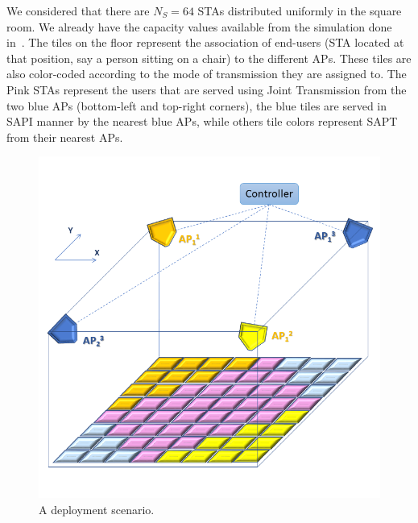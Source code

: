 We considered that there are $N_S = 64$ STAs distributed uniformly in the square room. We already have the capacity values available %
from the simulation done in~\cite{JT_decision}. The tiles on the floor represent the association of end-users (STA located at that position, say a person sitting on a chair) to the different APs. These tiles are also color-coded according to the mode of transmission they are assigned to.
The Pink STAs represent the users that are served using Joint Transmission from the two blue APs (bottom-left and top-right corners), the blue tiles are served in SAPI manner by the nearest blue APs, while others tile colors represent SAPT from their nearest APs.
\begin{figure}[h]
    \begin{center}
        \includegraphics[scale=0.4]{Scenario.png}
        \caption{A deployment scenario.}
        \label{fig:setup}
    \end{center}
\end{figure}









